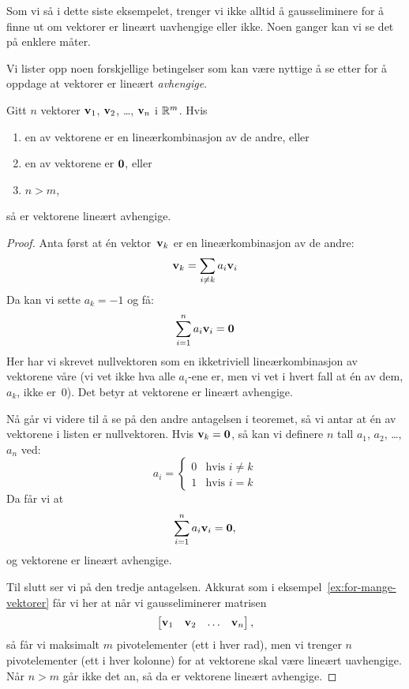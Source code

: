 Som vi så i dette siste eksempelet, trenger vi ikke alltid å
gausseliminere for å finne ut om vektorer er lineært uavhengige eller
ikke.  Noen ganger kan vi se det på enklere måter.

Vi lister opp noen forskjellige betingelser som kan være nyttige å se
etter for å oppdage at vektorer er lineært \emph{avhengige}.

\begin{thm}
\label{thm:linavhspan}
Gitt $n$ vektorer  $\mathbf{v}_1$, $\mathbf{v}_2$, \ldots, $\mathbf{v}_n$ i $\mathbb{R}^m$.  Hvis
\begin{enumerate}
\item en av vektorene er en lineærkombinasjon av de andre, eller
\item en av vektorene er $\mathbf{0}$, eller
\item $n > m$,
\end{enumerate}
så er vektorene lineært avhengige.
\end{thm}
\begin{proof}
Anta først at én vektor~$\mathbf{v}_k$ er en lineærkombinasjon av de andre:
\[
\mathbf{v}_k = \sum_{i \ne k} a_i \mathbf{v}_i
\]
Da kan vi sette $a_k = -1$ og få:
\[
\sum_{i = 1}^n a_i \mathbf{v}_i = \mathbf{0}
\]
Her har vi skrevet nullvektoren som en ikketriviell lineærkombinasjon
av vektorene våre (vi vet ikke hva alle $a_i$-ene er, men vi vet i
hvert fall at én av dem, $a_k$, ikke er~$0$).  Det betyr at vektorene
er lineært avhengige.

Nå går vi videre til å se på den andre antagelsen i teoremet, så vi
antar at én av vektorene i listen er nullvektoren.  Hvis
$\mathbf{v}_k = \mathbf{0}$, så kan vi definere $n$ tall $a_1$, $a_2$, \ldots,
$a_n$ ved:
\[
a_i =
\begin{cases}
0 & \text{hvis $i \ne k$} \\
1 & \text{hvis $i = k$}
\end{cases}
\]
Da får vi at
\[
\sum_{i = 1}^n a_i \mathbf{v}_i = \mathbf{0},
\]
og vektorene er lineært avhengige.

Til slutt ser vi på den tredje antagelsen.  Akkurat som i
eksempel~\ref{ex:for-mange-vektorer} får vi her at når vi
gausseliminerer matrisen
\[
\begin{bmatrix} \mathbf{v}_1 & \mathbf{v}_2 & \ldots & \mathbf{v}_n \end{bmatrix},
\]
så får vi maksimalt $m$ pivotelementer (ett i hver rad), men vi
trenger $n$ pivotelementer (ett i hver kolonne) for at vektorene skal
være lineært uavhengige.  Når $n > m$ går ikke det an, så da er
vektorene lineært avhengige.
\end{proof}

